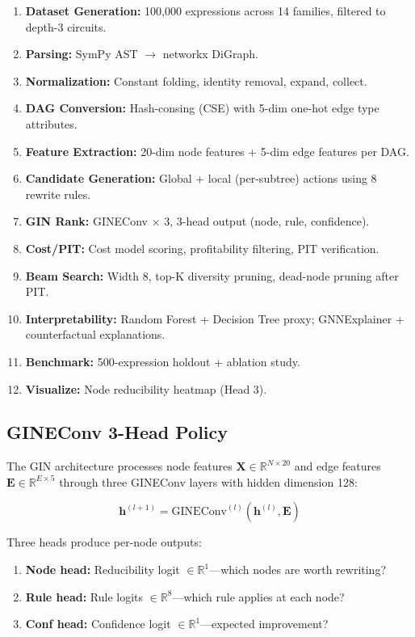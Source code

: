\documentclass[10pt]{article}
\begin{document}
\begin{enumerate}
    \item \textbf{Dataset Generation:} 100,000 expressions across 14 families,
          filtered to depth-3 circuits.
    \item \textbf{Parsing:} SymPy AST $\rightarrow$ networkx DiGraph.
    \item \textbf{Normalization:} Constant folding, identity removal, expand,
          collect.
    \item \textbf{DAG Conversion:} Hash-consing (CSE) with 5-dim one-hot edge
          type attributes.
    \item \textbf{Feature Extraction:} 20-dim node features + 5-dim edge
          features per DAG.
    \item \textbf{Candidate Generation:} Global + local (per-subtree) actions
          using 8 rewrite rules.
    \item \textbf{GIN Rank:} GINEConv $\times$ 3, 3-head output (node,
          rule, confidence).
    \item \textbf{Cost/PIT:} Cost model scoring, profitability filtering,
          PIT verification.
    \item \textbf{Beam Search:} Width 8, top-K diversity pruning, dead-node
          pruning after PIT.
    \item \textbf{Interpretability:} Random Forest + Decision Tree proxy;
          GNNExplainer + counterfactual explanations.
    \item \textbf{Benchmark:} 500-expression holdout + ablation study.
    \item \textbf{Visualize:} Node reducibility heatmap (Head 3).
\end{enumerate}

\subsection{GINEConv 3-Head Policy}

The GIN architecture processes node features $\mathbf{X} \in \mathbb{R}^{N \times
20}$ and edge features $\mathbf{E} \in \mathbb{R}^{E \times 5}$ through three
GINEConv layers with hidden dimension 128:

$$\mathbf{h}^{(l+1)} = \text{GINEConv}^{(l)}(\mathbf{h}^{(l)}, \mathbf{E})$$

Three heads produce per-node outputs:

\begin{enumerate}
    \item \textbf{Node head:} Reducibility logit $\in \mathbb{R}^1$—which nodes
          are worth rewriting?
    \item \textbf{Rule head:} Rule logits $\in \mathbb{R}^8$—which rule
          applies at each node?
    \item \textbf{Conf head:} Confidence logit $\in \mathbb{R}^1$—expected
          improvement?
\end{enumerate}
\end{document}
